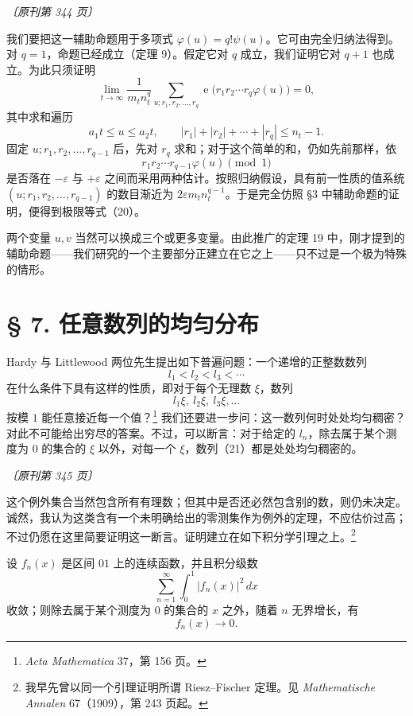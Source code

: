 \documentclass[UTF8,11pt,a4paper,fontset=none]{ctexart}
\theoremstyle{weylthm}
\newcommand{\e}{\operatorname{e}}
\newcommand{\origpage}[1]{%
  \par\vspace{0.7em}\noindent\hfill{\small\itshape〔原刊第 #1 页〕}\par\vspace{0.25em}}
\begin{document}
\origpage{344}

我们要把这一辅助命题用于多项式 \(\varphi(u)=q!\psi(u)\)。它可由完全归纳法得到。对 \(q=1\)，命题已经成立（定理 9）。假定它对 \(q\) 成立，我们证明它对 \(q+1\) 也成立。为此只须证明
\begin{equation}
  \lim_{t\to\infty}
  \frac{1}{m_tn_t^q}
  \sum_{u;r_1,r_2,\ldots,r_q}
  \e\bigl(r_1r_2\cdots r_q\varphi(u)\bigr)=0,
  \tag{20}
\end{equation}
其中求和遍历
\[
  a_1t\leq u\leq a_2t,
  \qquad
  |r_1|+|r_2|+\cdots+|r_q|\leq n_t-1.
\]
固定 \(u;r_1,r_2,\ldots,r_{q-1}\) 后，先对 \(r_q\) 求和；对于这个简单的和，仍如先前那样，依
\[
  r_1r_2\cdots r_{q-1}\varphi(u)\pmod 1
\]
是否落在 \(-\varepsilon\) 与 \(+\varepsilon\) 之间而采用两种估计。按照归纳假设，具有前一性质的值系统
\((u;r_1,r_2,\ldots,r_{q-1})\) 的数目渐近为
\(2\varepsilon m_tn_t^{q-1}\)。于是完全仿照 §3 中辅助命题的证明，便得到极限等式（20）。

两个变量 \(u,v\) 当然可以换成三个或更多变量。由此推广的定理 19 中，刚才提到的辅助命题——我们研究的一个主要部分正建立在它之上——只不过是一个极为特殊的情形。

\section*{§ 7. 任意数列的均匀分布}

Hardy 与 Littlewood 两位先生提出如下普遍问题：一个递增的正整数数列
\[
  l_1<l_2<l_3<\cdots
\]
在什么条件下具有这样的性质，即对于每个无理数 \(\xi\)，数列
\begin{equation}
  l_1\xi,\ l_2\xi,\ l_3\xi,\ldots
  \tag{21}
\end{equation}
按模 \(1\) 能任意接近每一个值？\footnote{\emph{Acta Mathematica} 37，第 156 页。}
我们还要进一步问：这一数列何时处处均匀稠密？对此不可能给出穷尽的答案。不过，可以断言：对于给定的 \(l_n\)，除去属于某个测度为 \(0\) 的集合的 \(\xi\) 以外，对每一个 \(\xi\)，数列（21）都是处处均匀稠密的。

\origpage{345}

这个例外集合当然包含所有有理数；但其中是否还必然包含别的数，则仍未决定。诚然，我认为这类含有一个未明确给出的零测集作为例外的定理，不应估价过高；不过仍愿在这里简要证明这一断言。证明建立在如下积分学引理之上。\footnote{我早先曾以同一个引理证明所谓 Riesz--Fischer 定理。见 \emph{Mathematische Annalen} 67（1909），第 243 页起。}

设 \(f_n(x)\) 是区间 \(01\) 上的连续函数，并且积分级数
\[
  \sum_{n=1}^{\infty}\int_0^1|f_n(x)|^2\,dx
\]
收敛；则除去属于某个测度为 \(0\) 的集合的 \(x\) 之外，随着 \(n\) 无界增长，有
\[
  f_n(x)\longrightarrow0.
\]
\end{document}
